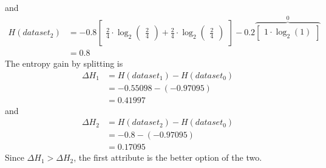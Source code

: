 \documentclass[11pt]{article}
\begin{document}
and
\begin{align*}
H(dataset_2) &=
-0.8 \begin{bmatrix}
\frac 24 \cdot \log_2 \begin{pmatrix}\frac 24\end{pmatrix} + \frac 24 \cdot \log_2 \begin{pmatrix}\frac 24\end{pmatrix}
\end{bmatrix} -0.2\overbrace{\begin{bmatrix}
1 \cdot \log_2 (1)
\end{bmatrix}}^0\\&=0.8
\end{align*}
The entropy gain by splitting is 
\begin{align*}
\Delta H_1 &= H(dataset_1) - H(dataset_0)\\&= -0.55098 - (-0.97095)\\&=0.41997
\end{align*}
and 
\begin{align*}
\Delta H_2 &= H(dataset_2) - H(dataset_0)\\&= -0.8 - (-0.97095)\\&=0.17095
\end{align*}
Since $\Delta H_1 > \Delta H_2$, the first attribute is the better option of the two.
\end{document}
